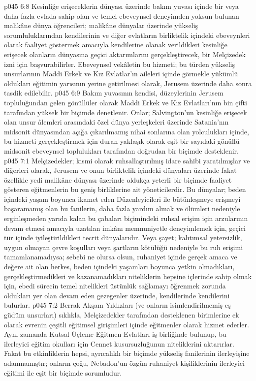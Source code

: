 \vs p045 6:8 Kesinliğe erişeceklerin dünyası üzerinde bakım yuvası içinde bir veya daha fazla evlada sahip olan ve temel ebeveynsel deneyimden yoksun bulunan malikâne dünya öğrencileri; malikâne dünyalar üzerinde yükseliş sorumluluklarından kendilerinin ve diğer evlatların birliktelik içindeki ebeveynleri olarak faaliyet göstermek amacıyla kendilerine olanak verildikleri kesinliğe erişecek olanların dünyasına geçici aktarımlarını gerçekleştirecek, bir Melçizedek izni için başvurabilirler. Ebeveynsel vekâletin bu hizmeti; bu türden yükseliş unsurlarının Maddi Erkek ve Kız Evlatlar’ın aileleri içinde görmekle yükümlü oldukları eğitimin yarısının yerine getirilmesi olarak, Jerusem üzerinde daha sonra tasdik edilebilir.
\vs p045 6:9 Bakım yuvasının kendisi, düzeylerinin Jerusem topluluğundan gelen gönüllüler olarak Maddi Erkek ve Kız Evlatları’nın bin çifti tarafından yüksek bir biçimde denetlenir. Onlar; Salvington’un kesinliğe erişecek olan unsur âlemleri arasındaki özel dünya yerleşkeleri üzerinde Satania’nın midsonit dünyasından açığa çıkarılmamış nihai sonlarına olan yolculukları içinde, bu hizmeti gerçekleştirmek için duran yaklaşık olarak eşit bir sayıdaki gönüllü midsonit ebeveynsel toplulukları tarafından doğrudan bir biçimde desteklenir.
\vs p045 7:1 Melçizedekler; kısmi olarak ruhsallaştırılmış idare sahibi yaratılmışlar ve diğerleri olarak, Jerusem ve onun birliktelik içindeki dünyaları üzerinde fakat özellikle yedi malikâne dünyası üzerinde oldukça yeterli bir biçimde faaliyet gösteren eğitmenlerin bu geniş birliklerine ait yöneticilerdir. Bu dünyalar; beden içindeki yaşam boyunca ikamet eden Düzenleyicileri ile bütünleşmeye erişmeyi başaramamış olan bu fanilerin, daha fazla yardım almak ve ölümleri nedeniyle erginleşmeden yarıda kalan bu çabaları biçimindeki ruhsal erişim için arzularının devam etmesi amacıyla uzatılan imkânı memnuniyetle deneyimlemek için, geçici tür içinde iyileştirildikleri tecrit dünyalarıdır. Veya şayet; kalıtımsal yetersizlik, uygun olmayan çevre koşulları veya şartların kötülüğü nedeniyle bu ruh erişimi tamamlanamadıysa; sebebi ne olursa olsun, ruhaniyet içinde gerçek amaca ve değere ait olan herkes, beden içindeki yaşamları boyunca yetkin olmadıkları, gerçekleştirmedikleri ve kazanamadıkları niteliklerin hepsine içlerinde sahip olmak için, ebedi sürecin temel nitelikleri üstünlük sağlamayı öğrenmek zorunda oldukları yer olan devam eden gezegenler üzerinde, kendilerinde kendilerini bulurlar.
\vs p045 7:2 Berrak Akşam Yıldızları (ve onların isimlendirilmemiş eş güdüm unsurları) sıklıkla, Melçizedekler tarafından desteklenen birimlerine ek olarak evrenin çeşitli eğitimsel girişimleri içinde eğitmenler olarak hizmet ederler. Aynı zamanda Kutsal Üçleme Eğitmen Evlatları iş birliğinde bulunup, bu ilerleyici eğitim okulları için Cennet kusursuzluğunun niteliklerini aktarırlar. Fakat bu etkinliklerin hepsi, ayrıcalıklı bir biçimde yükseliş fanilerinin ilerleyişine adanmamıştır; onların çoğu, Nebadon’un özgün ruhaniyet kişiliklerinin ilerleyici eğitimi ile eşit bir biçimde sorumludur.
